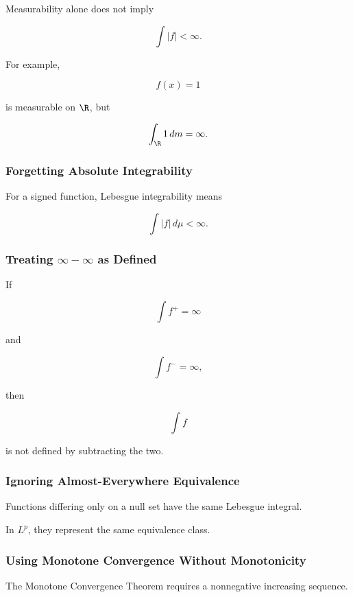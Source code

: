 Measurability alone does not imply

\[
\int|f|<\infty.
\]

For example,

\[
f(x)=1
\]

is measurable on \(\R\), but

\[
\int_{\R}1\,dm=\infty.
\]

\subsubsection{Forgetting Absolute Integrability}

For a signed function, Lebesgue integrability means

\[
\boxed{
\int|f|\,d\mu<\infty.
}
\]

\subsubsection{Treating \(\infty-\infty\) as Defined}

If

\[
\int f^+=\infty
\]

and

\[
\int f^-=\infty,
\]

then

\[
\int f
\]

is not defined by subtracting the two.

\subsubsection{Ignoring Almost-Everywhere Equivalence}

Functions differing only on a null set have the same Lebesgue integral.

In \(L^p\), they represent the same equivalence class.

\subsubsection{Using Monotone Convergence Without Monotonicity}

The Monotone Convergence Theorem requires a nonnegative increasing
sequence.


